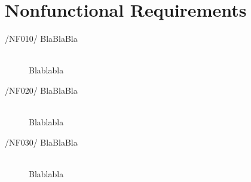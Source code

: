 \newpage
\section{Nonfunctional Requirements}

\begin{description}
\item[/NF010/ BlaBlaBla]\hfill \\ Blablabla
\item[/NF020/ BlaBlaBla]\hfill \\ Blablabla
\item[/NF030/ BlaBlaBla]\hfill \\ Blablabla
\end{description}